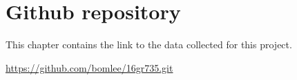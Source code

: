 \chapter{Github repository}
This chapter contains the link to the data collected for this project.

\url{https://github.com/bomlee/16gr735.git}